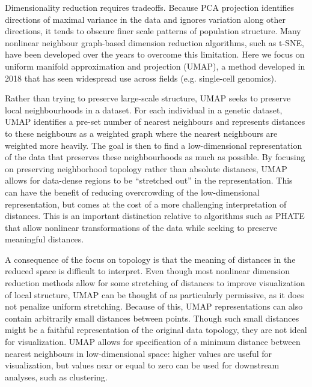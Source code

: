 Dimensionality reduction requires tradeoffs. Because PCA projection identifies directions of maximal variance in the data and ignores variation along other directions, it tends to obscure finer scale patterns of population structure. Many nonlinear neighbour graph-based dimension reduction algorithms, such as t-SNE\citep{maaten_visualizing_2008}, have been developed over the years to overcome this limitation. Here we focus on uniform manifold approximation and projection (UMAP)\citep{mcinnes_umap_2020}, a method developed in 2018 that has seen widespread use across fields (e.g. single-cell genomics\citep{becht2019dimensionality}). 

Rather than trying to preserve large-scale structure, UMAP seeks to preserve local neighbourhoods in a dataset. For each individual in a genetic dataset, UMAP identifies a pre-set number of nearest neighbours and represents distances to these neighbours as a weighted graph where the nearest neighbours are weighted more heavily. The goal is then to find a low-dimensional representation of the data that preserves these neighbourhoods as much as possible. By focusing on preserving neighborhood topology rather than absolute distances, UMAP allows for data-dense regions to be ``stretched out'' in the representation. This can have the benefit of reducing overcrowding of the low-dimensional representation, but comes at the cost of a more challenging interpretation of distances.  This is an important distinction relative to algorithms such as PHATE \citep{moon2019visualizing} that allow nonlinear transformations of the data while seeking to preserve meaningful distances. 

A consequence of the focus on topology is that the meaning of distances in the reduced space is difficult to interpret. Even though most nonlinear dimension reduction methods allow for some stretching of distances to improve visualization of local structure, UMAP can be thought of as particularly permissive, as it does not penalize uniform stretching. Because of this, UMAP representations can also contain arbitrarily small distances between points. Though such small distances might be a faithful representation of the original data topology, they are not ideal for visualization. UMAP allows for specification of a minimum distance between nearest neighbours in low-dimensional space: higher values are useful for visualization, but values near or equal to zero can be used for downstream analyses, such as clustering.

